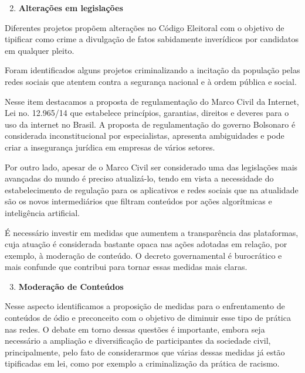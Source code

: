 \begin{enumerate}
\setcounter{enumi}{1}
\item\textbf{Alterações em legislações}
\end{enumerate}

  Diferentes projetos propõem alterações no Código Eleitoral com o
  objetivo de tipificar como crime a divulgação de fatos sabidamente
  inverídicos por candidatos em qualquer pleito.

  Foram identificados alguns projetos criminalizando a incitação da
  população pelas redes sociais que atentem contra a segurança nacional
  e à ordem pública e social.

  Nesse item destacamos a proposta de regulamentação do Marco Civil da
  Internet, Lei no. 12.965/14 que estabelece princípios, garantias,
  direitos e deveres para o uso da internet no Brasil. A proposta de
  regulamentação do governo Bolsonaro é considerada inconstitucional por
  especialistas, apresenta ambiguidades e pode criar a insegurança
  jurídica em empresas de vários setores.

  Por outro lado, apesar de o Marco Civil ser considerado uma das
  legislações mais avançadas do mundo é preciso atualizá-lo, tendo em
  vista a necessidade do estabelecimento de regulação para os
  aplicativos e redes sociais que na atualidade são os novos
  intermediários que filtram conteúdos por ações algorítmicas e
  inteligência artificial.

  É necessário investir em medidas que aumentem a transparência das
  plataformas, cuja atuação é considerada bastante opaca nas ações
  adotadas em relação, por exemplo, à moderação de conteúdo. O decreto
  governamental é burocrático e mais confunde que contribui para tornar
  essas medidas mais claras.

\begin{enumerate}
\setcounter{enumi}{2}
\item\textbf{Moderação de Conteúdos}
\end{enumerate}

Nesse aspecto identificamos a proposição de medidas para o enfrentamento
de conteúdos de ódio e preconceito com o objetivo de diminuir esse tipo
de prática nas redes. O debate em torno dessas questões é importante,
embora seja necessário a ampliação e diversificação de participantes da
sociedade civil, principalmente, pelo fato de considerarmos que várias
dessas medidas já estão tipificadas em lei, como por exemplo a
criminalização da prática de racismo.

